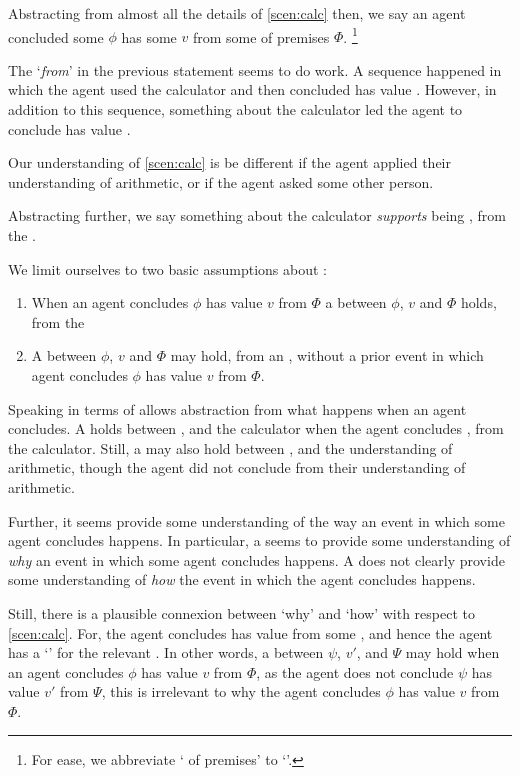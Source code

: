 \begin{note}
  Abstracting from almost all the details of \autoref{scen:calc} then, we say an agent concluded some \prop{} \(\phi\) has some \val{} \(v\) from some \pool{} of premises \(\Phi\).%
  \footnote{
    For ease, we abbreviate `\pool{} of premises' to `\pool{}'.
  }

  The `\emph{from}' in the previous statement seems to do work.
  A sequence happened in which the agent used the calculator and then concluded \propM{\gistCalcEq{}} has value .
  However, in addition to this sequence, something about the calculator led the agent to conclude \propM{\gistCalcEq{}} has value .

  Our understanding of \autoref{scen:calc} is be different if the agent applied their understanding of arithmetic, or if the agent asked some other person.
\end{note}

\begin{note}
  Abstracting further, we say something about the calculator \emph{supports} \propM{\gistCalcEq{}} being , from the \agpe{}.

  We limit ourselves to two basic assumptions about :
  \begin{enumerate}
  \item
    When an agent concludes \(\phi\) has value \(v\) from \(\Phi\) a \ros{} between \(\phi\), \(v\) and \(\Phi\) holds, from the \agpe{}
  \item
    A \ros{} between \(\phi\), \(v\) and \(\Phi\) may hold, from an \agpe{}, without a prior event in which agent concludes \(\phi\) has value \(v\) from \(\Phi\).
  \end{enumerate}
  Speaking in terms of  allows abstraction from what happens when an agent concludes.
  A \ros{} holds between \propM{\gistCalcEq{}},  and the calculator when the agent concludes \propM{\gistCalcEq{}},  from the calculator.
  Still, a \ros{} may also hold between \propM{\gistCalcEq{}},  and the \agents{} understanding of arithmetic, though the agent did not conclude from their understanding of arithmetic.

  Further, it seems  provide some understanding of the way an event in which some agent concludes happens.
  In particular, a \ros{} seems to provide some understanding of \emph{why} an event in which some agent concludes happens.
  A \ros{} does not clearly provide some understanding of \emph{how} the event in which the agent concludes happens.

  Still, there is a plausible connexion between `why' and `how' with respect to \autoref{scen:calc}.
  For, the agent concludes \propM{\gistCalcEq{}} has value  from some \pool{}, and hence the agent has a `\wit{}' for the relevant \ros{}.
  In other words, a \ros{} between \(\psi\), \(v'\), and \(\Psi\) may hold when an agent concludes \(\phi\) has value \(v\) from \(\Phi\), as the agent does not conclude \(\psi\) has value \(v'\) from \(\Psi\), this \ros{} is irrelevant to why the agent concludes \(\phi\) has value \(v\) from \(\Phi\).
\end{note}

